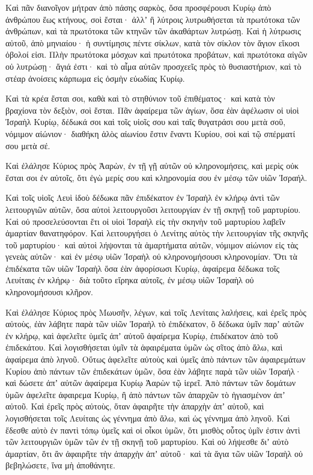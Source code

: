 {Καὶ πᾶν διανοῖγον μήτραν ἀπὸ πάσης σαρκὸς, ὅσα προσφέρουσι Κυρίῳ ἀπὸ ἀνθρώπου ἕως κτήνους, σοὶ ἔσται· ἀλλʼ ἢ λύτροις λυτρωθήσεται τὰ πρωτότοκα τῶν ἀνθρώπων, καὶ τὰ πρωτότοκα τῶν κτηνῶν τῶν ἀκαθάρτων λυτρώσῃ.
Καὶ ἡ λύτρωσις αὐτοῦ, ἀπὸ μηνιαίου· ἡ συντίμησις πέντε σίκλων, κατὰ τὸν σίκλον τὸν ἅγιον εἴκοσι ὀβολοί εἰσι.
Πλὴν πρωτότοκα μόσχων καὶ πρωτότοκα προβάτων, καὶ πρωτότοκα αἰγῶν οὐ λυτρώσῃ· ἅγιά ἐστι· καὶ τὸ αἷμα αὐτῶν προσχεεῖς πρὸς τὸ θυσιαστήριον, καὶ τὸ στέαρ ἀνοίσεις κάρπωμα εἰς ὀσμὴν εὐωδίας Κυρίῳ.
\par }{\PP {}Καὶ τὰ κρέα ἔσται σοι, καθὰ καὶ τὸ στηθύνιον τοῦ ἐπιθέματος· καὶ κατὰ τὸν βραχίονα τὸν δεξιὸν, σοὶ ἔσται.
Πᾶν ἀφαίρεμα τῶν ἁγίων, ὅσα ἐὰν ἀφέλωσιν οἱ υἱοὶ Ἰσραὴλ Κυρίῳ, δέδωκά σοι καὶ τοῖς υἱοῖς σου καὶ ταῖς θυγατράσι σου μετὰ σοῦ, νόμιμον αἰώνιον· διαθήκη ἁλὸς αἰωνίου ἔστιν ἔναντι Κυρίου, σοὶ καὶ τῷ σπέρματί σου μετὰ σέ.
\par }{\PP {}Καὶ ἐλάλησε Κύριος πρὸς Ἀαρὼν, ἐν τῇ γῇ αὐτῶν οὐ κληρονομήσεις, καὶ μερὶς οὐκ ἔσται σοι ἐν αὐτοῖς, ὅτι ἐγὼ μερίς σου καὶ κληρονομία σου ἐν μέσῳ τῶν υἱῶν Ἰσραήλ.
\par }{\PP {}Καὶ τοῖς υἱοῖς Λευὶ ἰδοὺ δέδωκα πᾶν ἐπιδέκατον ἐν Ἰσραὴλ ἐν κλήρῳ ἀντὶ τῶν λειτουργιῶν αὐτῶν, ὅσα αὐτοὶ λειτουργοῦσι λειτουργίαν ἐν τῇ σκηνῇ τοῦ μαρτυρίου.
Καὶ οὐ προσελεύσονται ἔτι οἱ υἱοὶ Ἰσραὴλ εἰς τὴν σκηνὴν τοῦ μαρτυρίου λαβεῖν ἁμαρτίαν θανατηφόρον.
Καὶ λειτουργήσει ὁ Λενίτης αὐτὸς τὴν λειτουργίαν τῆς σκηνῆς τοῦ μαρτυρίου· καὶ αὐτοὶ λήψονται τὰ ἁμαρτήματα αὐτῶν, νόμιμον αἰώνιον εἰς τὰς γενεὰς αὐτῶν· καὶ ἐν μέσῳ υἱῶν Ἰσραὴλ οὐ κληρονομήσουσι κληρονομίαν.
Ὅτι τὰ ἐπιδέκατα τῶν υἱῶν Ἰσραὴλ ὅσα ἐὰν ἀφορίσωσι Κυρίῳ, ἀφαίρεμα δέδωκα τοῖς Λευίταις ἐν κλήρῳ· διὰ τοῦτο εἴρηκα αὐτοῖς, ἐν μέσῳ υἱῶν Ἰσραὴλ οὐ κληρονομήσουσι κλῆρον.
\par }{\PP {}Καὶ ἐλάλησε Κύριος πρὸς Μωυσῆν, λέγων,
καὶ τοῖς Λενίταις λαλήσεις, καὶ ἐρεῖς πρὸς αὐτοὺς, ἐὰν λάβητε παρὰ τῶν υἱῶν Ἰσραὴλ τὸ ἐπιδέκατον, ὃ δέδωκα ὑμῖν παρʼ αὐτῶν ἐν κλήρῳ, καὶ ἀφελεῖτε ὑμεῖς ἀπʼ αὐτοῦ ἀφαίρεμα Κυρίῳ, ἐπιδέκατον ἀπὸ τοῦ ἐπιδεκάτου.
Καὶ λογισθήσεται ὑμῖν τὰ ἀφαιρέματα ὑμῶν ὡς σῖτος ἀπὸ ἅλω, καὶ ἀφαίρεμα ἀπὸ ληνοῦ.
Οὕτως ἀφελεῖτε αὐτοὺς καὶ ὑμεῖς ἀπὸ πάντων τῶν ἀφαιρεμάτων Κυρίου ἀπὸ πάντων τῶν ἐπιδεκάτων ὑμῶν, ὅσα ἐὰν λάβητε παρὰ τῶν υἱῶν Ἰσραήλ· καὶ δώσετε ἀπʼ αὐτῶν ἀφαίρεμα Κυρίῳ Ἀαρὼν τῷ ἱερεῖ.
Ἀπὸ πάντων τῶν δομάτων ὑμῶν ἀφελεῖτε ἀφαιρεμα Κυρίῳ, ἢ ἀπὸ πάντων τῶν ἀπαρχῶν τὸ ἡγιασμένον ἀπʼ αὐτοῦ.
Καὶ ἐρεῖς πρὸς αὐτοὺς, ὅταν ἀφαιρῆτε τὴν ἀπαρχὴν ἀπʼ αὐτοῦ, καὶ λογισθήσεται τοῖς Λευίταις ὡς γέννημα ἀπὸ ἅλω, καὶ ὡς γέννημα ἀπὸ ληνοῦ.
Καὶ ἔδεσθε αὐτὸ ἐν παντὶ τόπῳ ὑμεῖς καὶ οἱ οἶκοι ὑμῶν, ὅτι μισθὸς οὗτος ὑμῖν ἐστιν ἀντὶ τῶν λειτουργιῶν ὑμῶν τῶν ἐν τῇ σκηνῇ τοῦ μαρτυρίου.
Καὶ οὐ λήψεσθε διʼ αὐτὸ ἁμαρτίαν, ὅτι ἂν ἀφαιρῆτε τὴν ἀπαρχὴν ἀπʼ αὐτοῦ· καὶ τὰ ἅγια τῶν υἱῶν Ἰσραὴλ οὐ βεβηλώσετε, ἵνα μὴ ἀποθάνητε.

}
